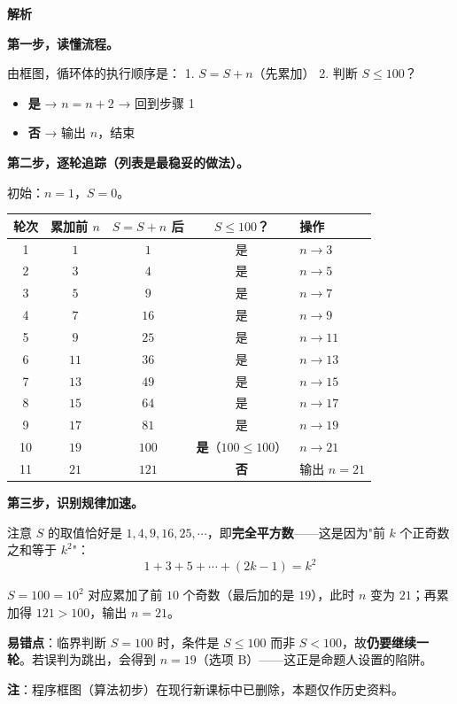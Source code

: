\textbf{解析}

\textbf{第一步，读懂流程。}

由框图，循环体的执行顺序是：
1. $S=S+n$（先累加）
2. 判断 $S\le100$？
\begin{itemize}
\item \textbf{是} → $n=n+2$ → 回到步骤 1
\item \textbf{否} → 输出 $n$，结束
\end{itemize}

\textbf{第二步，逐轮追踪（列表是最稳妥的做法）。}

初始：$n=1$，$S=0$。

\begin{center}
\begin{tabular}{ccccl}
\toprule
轮次 & 累加前 $n$ & $S=S+n$ 后 & $S\le100$？ & 操作 \\
\midrule
1 & $1$ & $1$ & 是 & $n\to3$ \\
2 & $3$ & $4$ & 是 & $n\to5$ \\
3 & $5$ & $9$ & 是 & $n\to7$ \\
4 & $7$ & $16$ & 是 & $n\to9$ \\
5 & $9$ & $25$ & 是 & $n\to11$ \\
6 & $11$ & $36$ & 是 & $n\to13$ \\
7 & $13$ & $49$ & 是 & $n\to15$ \\
8 & $15$ & $64$ & 是 & $n\to17$ \\
9 & $17$ & $81$ & 是 & $n\to19$ \\
10 & $19$ & $100$ & \textbf{是}（$100\le100$） & $n\to21$ \\
11 & $21$ & $121$ & \textbf{否} & 输出 $n=21$ \\
\bottomrule
\end{tabular}
\end{center}

\textbf{第三步，识别规律加速。}

注意 $S$ 的取值恰好是 $1,4,9,16,25,\cdots$，即\textbf{完全平方数}——这是因为"前 $k$ 个正奇数之和等于 $k^{2}$"：
\[1+3+5+\cdots+(2k-1)=k^{2}\]

$S=100=10^{2}$ 对应累加了前 $10$ 个奇数（最后加的是 $19$），此时 $n$ 变为 $21$；再累加得 $121>100$，输出 $n=21$。


\begin{gktip}
\textbf{易错点}：临界判断 $S=100$ 时，条件是 $S\le100$ 而非 $S<100$，故\textbf{仍要继续一轮}。若误判为跳出，会得到 $n=19$（选项 B）——这正是命题人设置的陷阱。

\textbf{注}：程序框图（算法初步）在现行新课标中已删除，本题仅作历史资料。
\end{gktip}

